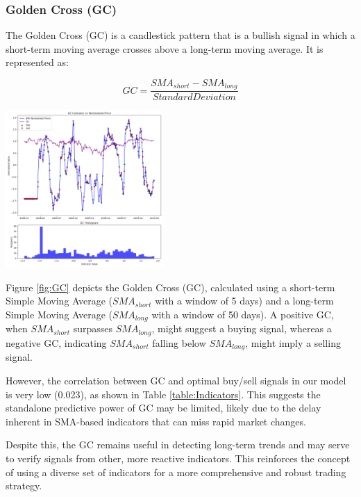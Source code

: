 \documentclass[
	letterpaper, %
]{jdf}
\begin{document}
\subsubsection{Golden Cross (GC)}

The Golden Cross (GC) is a candlestick pattern that is a bullish signal in which a short-term moving average crosses above a long-term moving average. It is represented as:

\[
GC = \frac{SMA_{short} - SMA_{long}}{StandardDeviation}
\]

\begin{jdffigure}
	\includegraphics[height=6cm]{Figures/GC_hist_and_price.png} \\
	\label{fig:GC}%
	\end{jdffigure}


Figure \ref{fig:GC} depicts the Golden Cross (GC), calculated using a short-term Simple Moving Average ($SMA_{short}$ with a window of 5 days) and a long-term Simple Moving Average ($SMA_{long}$ with a window of 50 days). A positive GC, when $SMA_{short}$ surpasses $SMA_{long}$, might suggest a buying signal, whereas a negative GC, indicating $SMA_{short}$ falling below $SMA_{long}$, might imply a selling signal.

However, the correlation between GC and optimal buy/sell signals in our model is very low (0.023), as shown in Table \ref{table:Indicators}. This suggests the standalone predictive power of GC may be limited, likely due to the delay inherent in SMA-based indicators that can miss rapid market changes.

Despite this, the GC remains useful in detecting long-term trends and may serve to verify signals from other, more reactive indicators. This reinforces the concept of using a diverse set of indicators for a more comprehensive and robust trading strategy.
\end{document}
